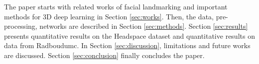 The paper starts with related works of facial landmarking and important methods for 3D deep learning in Section \ref{sec:works}. Then, the data, pre-processing, networks are described in Section \ref{sec:methods}. Section \ref{sec:results} presents quantitative results on the Headspace dataset and quantitative results on data from Radboudumc. In Section \ref{sec:discussion}, limitations and future works are discussed. Section \ref{sec:conclusion} finally concludes the paper.


